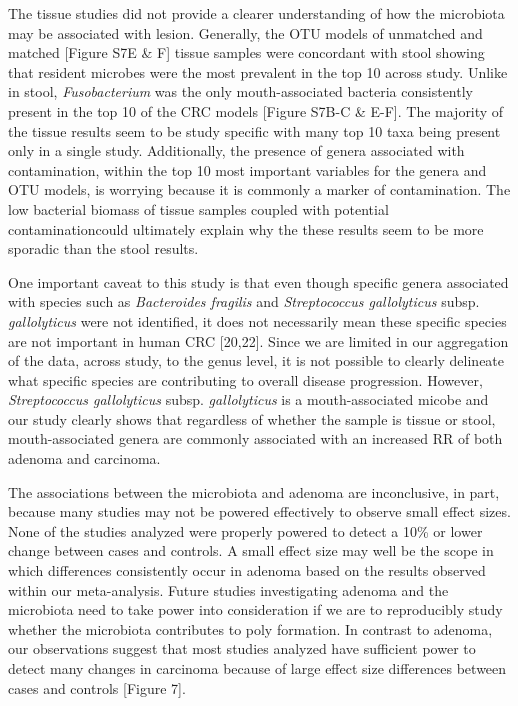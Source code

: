 \documentclass[12pt,]{article}
\begin{document}
The tissue studies did not provide a clearer understanding of how the
microbiota may be associated with lesion. Generally, the OTU models of
unmatched and matched {[}Figure S7E \& F{]} tissue samples were
concordant with stool showing that resident microbes were the most
prevalent in the top 10 across study. Unlike in stool,
\emph{Fusobacterium} was the only mouth-associated bacteria consistently
present in the top 10 of the CRC models {[}Figure S7B-C \& E-F{]}. The
majority of the tissue results seem to be study specific with many top
10 taxa being present only in a single study. Additionally, the presence
of genera associated with contamination, within the top 10 most
important variables for the genera and OTU models, is worrying because
it is commonly a marker of contamination. The low bacterial biomass of
tissue samples coupled with potential contaminationcould ultimately
explain why the these results seem to be more sporadic than the stool
results.

One important caveat to this study is that even though specific genera
associated with species such as \emph{Bacteroides fragilis} and
\emph{Streptococcus gallolyticus} subsp. \emph{gallolyticus} were not
identified, it does not necessarily mean these specific species are not
important in human CRC {[}20,22{]}. Since we are limited in our
aggregation of the data, across study, to the genus level, it is not
possible to clearly delineate what specific species are contributing to
overall disease progression. However, \emph{Streptococcus gallolyticus}
subsp. \emph{gallolyticus} is a mouth-associated micobe and our study
clearly shows that regardless of whether the sample is tissue or stool,
mouth-associated genera are commonly associated with an increased RR of
both adenoma and carcinoma.

The associations between the microbiota and adenoma are inconclusive, in
part, because many studies may not be powered effectively to observe
small effect sizes. None of the studies analyzed were properly powered
to detect a 10\% or lower change between cases and controls. A small
effect size may well be the scope in which differences consistently
occur in adenoma based on the results observed within our meta-analysis.
Future studies investigating adenoma and the microbiota need to take
power into consideration if we are to reproducibly study whether the
microbiota contributes to poly formation. In contrast to adenoma, our
observations suggest that most studies analyzed have sufficient power to
detect many changes in carcinoma because of large effect size
differences between cases and controls {[}Figure 7{]}.
\end{document}
